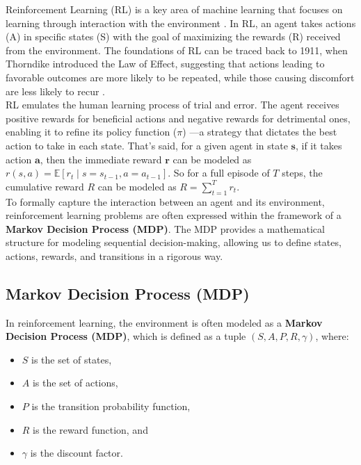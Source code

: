 
\renewcommand\theparagraph{\arabic{subsubsection}.\arabic{paragraph}}
\titleformat{\paragraph}[hang]{\normalfont\normalsize\bfseries}{\theparagraph}{1em}{}

Reinforcement Learning (RL) is a key area of machine learning that focuses on
learning through interaction with the environment  \cite{bg2}. In RL, an agent takes
actions (A) in specific states (S) with the goal of maximizing the rewards (R)
received from the environment. The foundations of RL can be traced back to
1911, when Thorndike introduced the Law of Effect, suggesting that actions
leading to favorable outcomes are more likely to be repeated, while those
causing discomfort are less likely to recur \cite{bg1}.\\ RL emulates the human
learning process of trial and error. The agent receives positive rewards for
beneficial actions and negative rewards for detrimental ones, enabling it to
refine its policy function ($\pi$) —a strategy that dictates the best action to take in
each state. That's said, for a given agent in state $\textbf{s}$, if it takes action $\textbf{a}$,
then the immediate reward $\textbf{r}$ can be modeled as $r(s, a) = \mathbb{E}[r_t \mid
    s=s_{t-1}, a=a_{t-1}]$. So for a full episode of $T$ steps, the cumulative
reward \textbf{$R$} can be modeled as $R = \sum_{t=1}^{T} r_t$.\\


To formally capture the interaction between an agent and its environment,
reinforcement learning problems are often expressed within the framework
of a \textbf{Markov Decision Process (MDP)}. The MDP provides a mathematical structure
for modeling sequential decision-making, allowing us to define states,
actions, rewards, and transitions in a rigorous way.


\subsection{Markov Decision Process (MDP)}

In reinforcement learning, the environment is often modeled as a \textbf{Markov
    Decision Process (MDP)}, which is defined as a tuple $(S, A, P, R, \gamma)$,
where:
\begin{itemize}
    \item \( S \) is the set of states,
    \item \( A \) is the set of actions,
    \item \( P \) is the transition probability function,
    \item \( R \) is the reward function, and
    \item \( \gamma \) is the discount factor.
\end{itemize}
 
